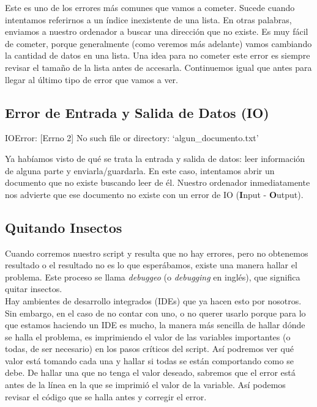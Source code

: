 \documentclass[10pt,letterpaper]{article}
\newenvironment{Code}
{
\begin{lrbox}{\selvestebox}%
\begin{minipage}{\dimexpr\columnwidth-2\fboxsep\relax}
\fontfamily{\ttdefault}\selectfont
}
{\end{minipage}\end{lrbox}%
\begin{center}
\colorbox{light-gray}{\usebox{\selvestebox}}
\end{center}
}
\begin{document}
Este es uno de los errores m\'as comunes que vamos a cometer. Sucede cuando intentamos referirnos a un \'indice inexistente de una lista. En otras palabras, enviamos a nuestro ordenador a buscar una direcci\'on que no existe. Es muy f\'acil de cometer, porque generalmente (como veremos m\'as adelante) vamos cambiando la cantidad de datos en una lista. Una idea para no cometer este error es siempre revisar el tama\~no de la lista antes de accesarla. Continuemos igual que antes para llegar al \'ultimo tipo de error que vamos a ver.

\subsection{Error de Entrada y Salida de Datos (IO)}

\begin{Code}
{\color{red} IOError: [Errno 2] No such file or directory: `algun\_documento.txt'}
\end{Code}

Ya hab\'iamos visto de qu\'e se trata la entrada y salida de datos: leer informaci\'on de alguna parte y enviarla/guardarla. En este caso, intentamos abrir un documento que no existe buscando leer de \'el. Nuestro ordenador inmediatamente nos advierte que ese documento no existe con un error de IO (\textbf{I}nput - \textbf{O}utput).

\subsection{Quitando Insectos}
Cuando corremos nuestro script y resulta que no hay errores, pero no obtenemos resultado o el resultado no es lo que esper\'abamos, existe una manera hallar el problema. Este proceso se llama \emph{debuggeo} (o \emph{debugging} en ingl\'es), que significa quitar insectos.\\

Hay ambientes de desarrollo integrados (IDEs) que ya hacen esto por nosotros. Sin embargo, en el caso de no contar con uno, o no querer usarlo porque para lo que estamos haciendo un IDE es mucho, la manera m\'as sencilla de hallar d\'onde se halla el problema, es imprimiendo el valor de las variables importantes (o todas, de ser necesario) en los pasos cr\'iticos del script. As\'i podremos ver qu\'e valor est\'a tomando cada una y hallar si todas se est\'an comportando como se debe. De hallar una que no tenga el valor deseado, sabremos que el error est\'a antes de la l\'inea en la que se imprimi\'o el valor de la variable. As\'i podemos revisar el c\'odigo que se halla antes y corregir el error.
\end{document}
